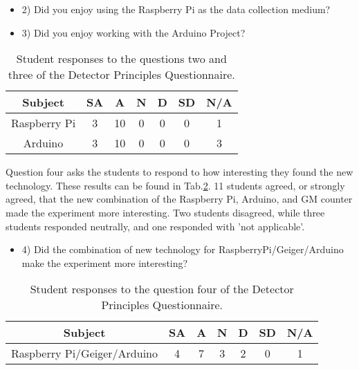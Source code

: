 \begin{table}[htpb]
  \scriptsize
  \begin{center}
    \caption{\scriptsize Student responses to the questions two and three of the Detector Principles Questionnaire.}
    \label{tab:t12q23}
    \begin{itemize}
    \item 2) Did you enjoy using the Raspberry Pi as the data collection medium?
    \item 3) Did you enjoy working with the Arduino Project?
    \end{itemize}
    

    \begin{tabular}{|c | c | c | c | c | c | c|}
      \hline
      Subject & SA & A & N & D & SD & N/A\\
      \hline
      Raspberry Pi & 3 & 10 & 0 & 0 & 0 & 1\\
      \hline
      Arduino & 3 & 10 & 0 & 0 & 0 & 3\\
      \hline
    \end{tabular}
  \end{center}%
\end{table}


Question four asks the students to respond to how interesting they found the new technology.
These results can be found in Tab.\ref{tab:t12q4}.
11 students agreed, or strongly agreed, that the new combination of the Raspberry Pi, Arduino, and GM counter made the experiment more interesting.
Two students disagreed, while three students responded neutrally, and one responded with 'not applicable'.

\begin{table}[htpb]
  \scriptsize
  \begin{center}
    \caption{\scriptsize Student responses to the question four of the Detector Principles Questionnaire.}
    \label{tab:t12q4}
    \begin{itemize}
    \item  4) Did the combination of new technology for RaspberryPi/Geiger/Arduino make the experiment more interesting?
    \end{itemize}
    

    \begin{tabular}{|c | c | c | c | c | c | c|}
      \hline
      Subject & SA & A & N & D & SD & N/A\\
      \hline
      Raspberry Pi/Geiger/Arduino & 4 & 7 & 3 & 2 & 0 & 1\\
      \hline
    \end{tabular}
  \end{center}%
\end{table}


